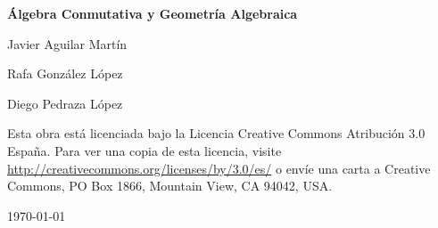 \documentclass[twoside]{report}
\makeatletter
\theoremstyle{definition}
\renewcommand\tableofcontents{%
  \null\hfill\textbf{\Large\contentsname}\hfill\null\par
  \@mkboth{\MakeUppercase\contentsname}{\MakeUppercase\contentsname}%
  \@starttoc{toc}%
}
\makeatother
\begin{document}

\renewcommand\chaptername{\Huge Tema}

\titleformat{\chapter}[display]
    {\normalfont\huge\bfseries}{\chaptertitlename\ \thechapter}{10pt}{\Huge}
\titlespacing*{\chapter}{0pt}{-1cm}{10pt}



\begin{titlepage}
	\centering
	{\huge\bfseries Álgebra Conmutativa y Geometría Algebraica \par}
	\vspace{2cm}
	{\Large Javier Aguilar Martín\par}
	{\Large Rafa González López\par}
	{\Large Diego Pedraza López\par}
	\vspace{2.5cm}
	\vfill
	Esta obra está licenciada bajo la Licencia Creative Commons Atribución 3.0 España. Para ver una copia de esta licencia, visite \url{http://creativecommons.org/licenses/by/3.0/es/} o envíe una carta a Creative Commons, PO Box 1866, Mountain View, CA 94042, USA.

	{\large \today\par}
\end{titlepage}

\tableofcontents


%
%
%
%
%
%
\end{document}

